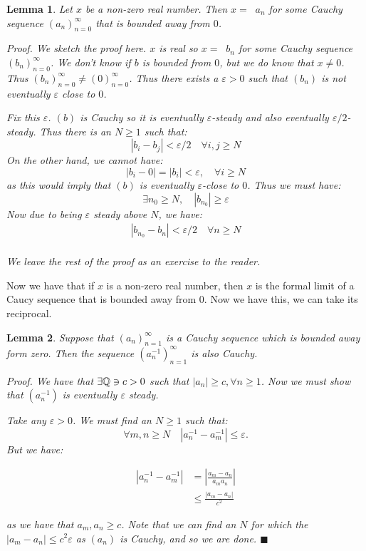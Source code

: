 \documentclass{article}
\newtheorem{lemma}{Lemma}[subsection]
\newcommand{\Q}{\mathbb{Q}}
\newcommand{\vep}{\varepsilon} %
\newcommand{\leftin}{\mathrel{\reflectbox{$\in$}}}
\DeclareMathOperator{\infLIM}{\mathrm{LIM}_{n \to \infty}}
\let\it\textit
\begin{document}
\begin{lemma}
	 Let $x$ be a non-zero real number. Then 
	 $x = \infLIM a_n$ for some Cauchy sequence
	 $(a_n)_{n=0}^\infty$ that is bounded away from $0$.

	 \it{Proof}. We sketch the proof here. $x$ is
	 real so $x = \infLIM b_n$ for some Cauchy sequence
	 $(b_n)_{n=0}^\infty$. We don't know if $b$ is bounded 
	 from $0$, but we do know that $x \neq 0$. Thus 
	 $(b_n)_{n=0}^\infty \neq (0)_{n=0}^\infty$. 
	 Thus there exists a $\vep > 0$ such that 
	 $(b_n)$ is not eventually $\vep$ close to $0$.

	 Fix this $\vep$. $(b)$ is Cauchy so it is eventually 
	 $\vep$-steady and also eventually $\vep/2$-steady.
	 Thus there is an $N \geq 1$ such that:
	 $$
	 |b_i - b_j| < \vep/2 \quad \forall i,j \geq N
	 $$
	 On the other hand, we cannot have:
	 $$
	 |b_i -0| = |b_i| < \vep, \quad \forall i \geq N 
	 $$
	 as this would imply that $(b)$ is eventually $\vep$-close to $0$.
	 Thus we must have:
	 $$
	 \exists n_0 \geq N, \quad |b_{n_0}| \geq \vep
	 $$
	 Now due to being $\vep$ steady above $N$, we have:
	 \begin{align*}
		 |b_{n_0} - b_n| < \vep/2 \quad \forall n \geq N\\ 
	 \end{align*}

	 We leave the rest of the proof as an exercise to the reader.
\end{lemma}

Now we have that if $x$ is a non-zero real number, then 
$x$ is the formal limit of a Caucy sequence that 
is bounded away from $0$. Now we have this, we can 
take its reciprocal. 

\begin{lemma}
	 Suppose  that $(a_n)_{n=1}^\infty$ is a Cauchy sequence 
	 which is bounded away form zero. Then the sequence 
	 $(a_n^{-1})_{n=1}^\infty$ is also  Cauchy. 

	 \it{Proof}. We have that $\exists \Q \leftin c > 0$ such 
	 that $|a_n| \geq c, \forall n \geq 1$. Now
	 we must show that $(a_n^{-1})$ is eventually 
	 $\vep$ steady. 

	 Take any $\vep > 0$. We must find an $N \geq 1$ such 
	 that: 
	 $$
	 \forall m,n \geq N \quad |a_n^{-1} - a_m^{-1}| \leq \vep. 
	 $$
	 But we have: 

	 \begin{align*}
		 |a_n^{-1} - a_m^{-1}| &= \left| 
		 \frac{a_m - a_n}{a_ma_n} \right| \\ 
		 &\leq \frac{|a_m - a_n|}{c^2}
	 \end{align*}

	 as we have that $a_m, a_n \geq c$. Note that we
	 can find an $N$ for which the $|a_m - a_n| \leq c^2 \vep$ 
	 as $(a_n)$ is Cauchy, and so we are done. 
	 \hfill $\blacksquare$
\end{lemma}
\end{document}
